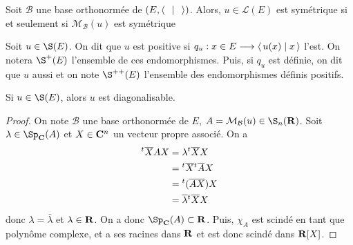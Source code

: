 \begin{prop}
    Soit $\mathcal  B$ une base orthonormée de $(E, \scalar{\;}{\;} )$. Alors, $u \in  \mathcal  L(E)$ est symétrique si et seulement si $\mathcal M_{\mathcal  B}(u)$ est symétrique
\end{prop}

\begin{dfn}
    Soit $u \in  \S(E)$. On dit que $u$ est positive si  $q_u: x \in  E \longrightarrow \scalar{u(x)}{x} $ l'est. On notera $\S^+(E)$ l'ensemble de ces endomorphismes. Puis, si  $q_u$ est définie, on dit que  $u$ aussi et on note  $\S^{++}(E)$ l'ensemble des endomorphismes définis positifs.
\end{dfn}

\begin{thm}
    Si $u \in \S(E)$, alors $u$ est diagonalisable.%
\end{thm}

\begin{proof}
    On note $\mathcal  B$ une base orthonormée de $E$,  $A=\mathcal  M_{\mathcal  B}(u) \in \S_n(\R)$. Soit $ \lambda \in  \Sp_{\C}(A)$ et $X \in \mathbf C^n$ un vecteur propre associé. On a 
\begin{align*}
    {}^t \overline{X} AX &= \lambda {}^t \overline{X}X \\
                         &= {}^t \overline{X}{}^t \overline{A}X\\
                         &= {}^t (\overline{A X})X \\
                         &= \overline{\lambda} {}^t \overline{X}X
\end{align*}
    donc $ \lambda=\bar\lambda$ et $\lambda \in  \mathbf R$. On a donc $\Sp_{\C}(A)\subset \R$. Puis, $\chi_A$ est scindé en tant que polynôme complexe, et a ses racines dans $\mathbf R$ et est donc scindé dans $\mathbf R[X]$.
\end{proof}

